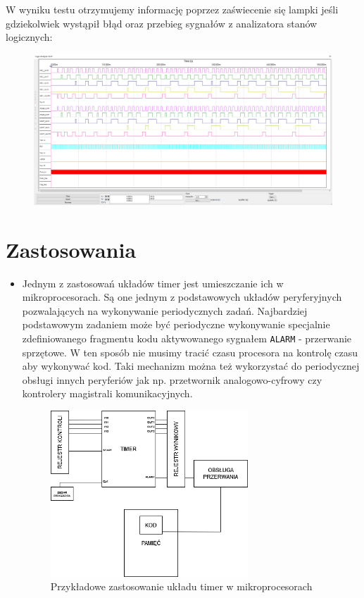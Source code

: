 \documentclass[a4paper]{article}
\begin{document}
\pagebreak
W wyniku testu otrzymujemy informację poprzez zaświecenie się lampki jeśli gdziekolwiek wystąpił błąd oraz 
przebieg sygnałów z analizatora stanów logicznych:
\begin{figure}[H]
    \centering
    \includegraphics[width=\textwidth]{general_test_logic_analyzer.png}
\end{figure}
\pagebreak
\section{Zastosowania}
\begin{itemize}
    \item Jednym z zastosowań układów timer jest umieszczanie ich w mikroprocesorach. Są one jednym 
            z podstawowych układów peryferyjnych pozwalających na wykonywanie periodycznych 
            zadań. Najbardziej podstawowym zadaniem może być periodyczne wykonywanie specjalnie
            zdefiniowanego fragmentu kodu aktywowanego sygnałem \verb|ALARM| - przerwanie sprzętowe.
            W ten sposób nie musimy tracić czasu procesora na kontrolę czasu aby wykonywać kod. 
            Taki mechanizm można też wykorzystać do periodycznej obsługi innych peryferiów jak np.
            przetwornik analogowo-cyfrowy czy kontrolery magistrali komunikacyjnych.
    \begin{figure}[H]
        \centering
        \includegraphics[width=0.7\textwidth]{timer_use_mcu.png}
        \caption{Przykładowe zastosowanie układu timer w mikroprocesorach}
    \end{figure}
\end{itemize}
\end{document}
